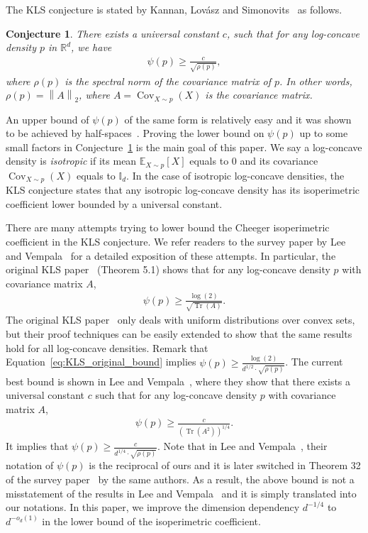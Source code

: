 \documentclass[11pt,twoside]{article}
\newcommand{\spec}[1]{\rho\parenth{#1}}
\newcommand{\isoperi}{\psi}
\theoremstyle{named}
\theoremstyle{plain}
\newtheorem{conjecture}{Conjecture}
\newcommand{\vecnorm}[2]{\left\| #1\right\|_{#2}}
\newcommand{\Exs}{\ensuremath{{\mathbb{E}}}}
\newcommand{\usedim}{\ensuremath{d}}
\newcommand{\dims}{\usedim}
\DeclareMathOperator{\Cov}{Cov}
\DeclareMathOperator{\trace}{Tr}
\newcommand{\Ind}{\ensuremath{\mathbb{I}}}
\newcommand{\real}{\ensuremath{\mathbb{R}}}
\newcommand{\parenth}[1]{\left( #1 \right)}
\begin{document}
The KLS conjecture is stated by Kannan, Lov\'asz and Simonovits~\cite{kannan1995isoperimetric} as follows.
\begin{conjecture}
  \label{cj:main}
  There exists a universal constant $c$, such that for any log-concave density $p$ in $\real^\dims$, we have
  \begin{align*}
    \isoperi(p) \geq \frac{c}{\sqrt{\spec{p}}},
  \end{align*}
  where $\spec{p}$ is the spectral norm of the covariance matrix of $p$. In other words, $\spec{p} = \vecnorm{A}{2}$, where $A = \Cov_{X \sim p} (X)$ is the covariance matrix.
\end{conjecture}
An upper bound of $\isoperi(p)$ of the same form is relatively easy and it was shown to be achieved by half-spaces~\cite{kannan1995isoperimetric}. Proving the lower bound on $\isoperi(p)$ up to some small factors in Conjecture~\ref{cj:main} is the main goal of this paper. We say a log-concave density is \textit{isotropic} if its mean $\Exs_{X\sim p} [X]$ equals to $0$ and its covariance $\Cov_{X\sim p}(X)$ equals to $\Ind_\dims$. In the case of isotropic log-concave densities, the KLS conjecture states that any isotropic log-concave density has its isoperimetric coefficient lower bounded by a universal constant.

There are many attempts trying to lower bound the Cheeger isoperimetric coefficient in the KLS conjecture. We refer readers to the survey paper by Lee and Vempala~\cite{lee2018kannan} for a detailed exposition of these attempts. In particular, the original KLS paper~\cite{kannan1995isoperimetric} (Theorem 5.1) shows that for any log-concave density $p$ with covariance matrix $A$,
\begin{align}
  \label{eq:KLS_original_bound}
  \isoperi(p) \geq \frac{\log(2)}{\sqrt{\trace\parenth{A}}}.
\end{align}
The original KLS paper~\cite{kannan1995isoperimetric} only deals with uniform distributions over convex sets, but their proof techniques can be easily extended to show that the same results hold for all log-concave densities.
Remark that Equation~\eqref{eq:KLS_original_bound} implies $\isoperi(p) \geq \frac{\log(2)}{\dims^{1/2} \cdot \sqrt{\spec{p}}}$.
The current best bound is shown in Lee and Vempala~\cite{lee2016eldan}, where they show that there exists a universal constant $c$ such that for any log-concave density $p$ with covariance matrix $A$,
\begin{align}
  \label{eq:Lee_and_Vempala_bound}
  \isoperi(p) \geq \frac{c}{\parenth{\trace\parenth{A^2}}^{1/4}}.
\end{align}
It implies that $\isoperi(p) \geq \frac{c}{\dims^{1/4} \cdot \sqrt{\spec{p}}}$. Note that in Lee and Vempala~\cite{lee2016eldan}, their notation of $\isoperi(p)$ is the reciprocal of ours and it is later switched in Theorem 32 of the survey paper~\cite{lee2018kannan} by the same authors. As a result, the above bound is not a misstatement of the results in Lee and Vempala~\cite{lee2016eldan} and it is simply translated into our notations. In this paper, we improve the dimension dependency $\dims^{-1/4}$ to $\dims^{-o_\dims(1)}$ in the lower bound of the isoperimetric coefficient.
\end{document}
